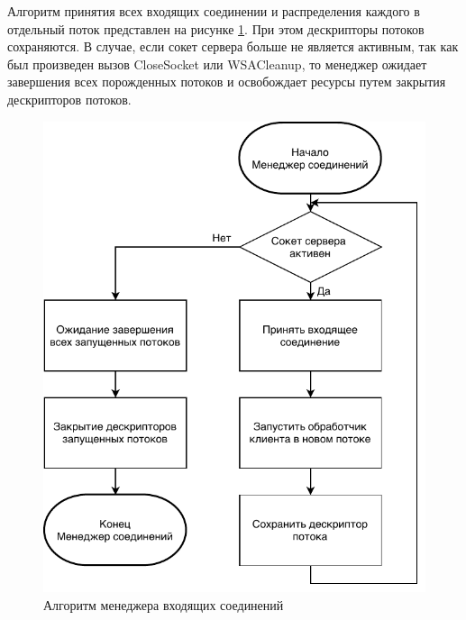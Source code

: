 Алгоритм принятия всех входящих соединении и распределения каждого в отдельный поток представлен на рисунке \ref*{sec:development:algos:connnectionmanager}. При этом дескрипторы потоков сохраняются. В случае, если сокет сервера больше не является активным, так как был произведен вызов CloseSocket или WSACleanup, то менеджер ожидает завершения всех порожденных потоков и освобождает ресурсы путем закрытия дескрипторов потоков.

\begin{figure}[!hbt]
	\centering
	  \includegraphics[scale=1.5]{attachments/ConnectionManager.pdf}  
	  \caption{ Алгоритм менеджера входящих соединений }
	  \label{sec:development:algos:connnectionmanager}
\end{figure}






